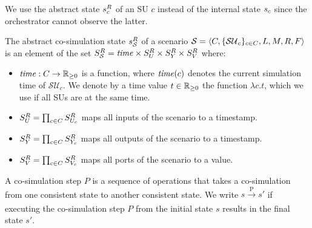 We use the abstract state $s^{R}_{c}$ of an SU $c$ instead of the internal state $s_{c}$ since the orchestrator cannot observe the latter.

\begin{definition}\label{def:cosimstate}
  The abstract co-simulation state $s^{R}_{\mathcal{S}}$ of a scenario $\mathcal{S} = \left\langle C, \{\mathcal{SU}_c\}_{c \in C}, L, M, R, F \right\rangle $ is an element of the set $S^{R}_{\mathcal{S}} = \mathit{time} \times S^{R}_{U} \times S^{R}_{Y} \times S^{R}_{V}$
  where:
  \begin{itemize}
    \item $\mathit{time} : C \to \mathbb{R}_{\geq 0}$ is a function, where $\mathit{time}(c)$ denotes the current simulation time of $\mathcal{SU}_c$.
    We denote by a time value $t \in \mathbb{R}_{\geq 0}$ the function $\lambda c.t$, which we use if all SUs are at the same time.
    \item $S^{R}_{U} = \prod_{c \in C} S^{R}_{U_{c}}$ maps all inputs of the scenario to a timestamp. 
    \item $S^{R}_{Y} = \prod_{c \in C} S^{R}_{Y_{c}}$ maps all outputs of the scenario to a timestamp. 
    \item $S^{R}_{V} =  \prod_{c \in C} S^{R}_{V_c}$ maps all ports of the scenario to a value. 
  \end{itemize}
\end{definition}

A co-simulation step $P$ is a sequence of operations that takes a co-simulation from one consistent state to another consistent state.
We write $ s \xrightarrow[\text{}]{\text{P}} s'$ if executing the co-simulation step $P$ from the initial state $s$ results in the final state $s'$.

